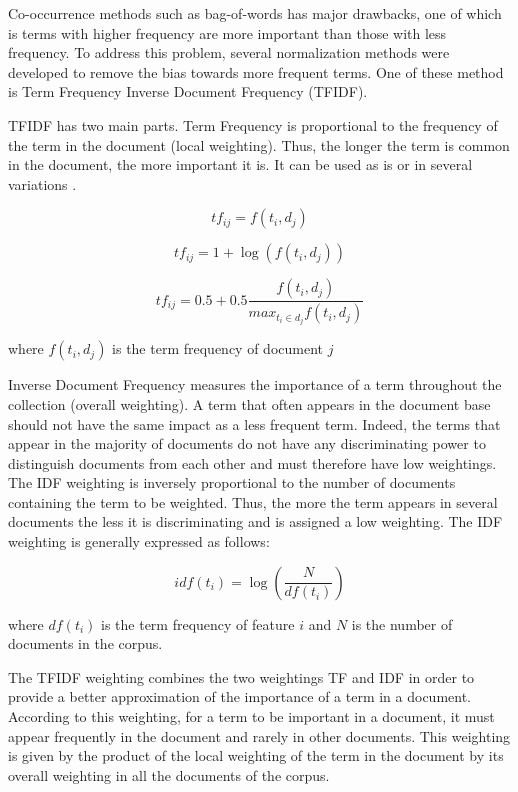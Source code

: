 Co-occurrence methods such as bag-of-words has major drawbacks, one of which is terms with higher frequency are more important than those with less frequency. To address this problem, several normalization methods were developed to remove the bias towards more frequent terms. One of these method is Term Frequency Inverse Document Frequency (TFIDF).

TFIDF has two main parts. Term Frequency is proportional to the frequency of the term in the document (local weighting). Thus, the longer the term is common in the document, the more important it is. It can be used as is or in several variations \citep{singhal1997learning} \citep{sable2001using}.

$$t f _ { i j } = f \left( t _ { i } , d _ { j } \right)$$

$$t f _ { i j } = 1 + \log \left( f \left( t _ { i } , d _ { j } \right) \right)$$

$$ t f _ { i j } = 0.5 + 0.5 \frac { f \left( t _ { i } , d _ { j } \right) } { m a x _ { t _ { i } \in d _ { j } } f \left( t _ { i } , d _ { j } \right) }$$

where $f(t_{i},d_{j})$ is the term frequency of document $j$

Inverse Document Frequency measures the importance of a term throughout the collection (overall weighting). A term that often appears in the document base should not have the same impact as a less frequent term. Indeed, the terms that appear in the majority of documents do not have any discriminating power to distinguish documents from each other and must therefore have low weightings. The IDF weighting is inversely proportional to the number of documents containing the term to be weighted. Thus, the more the term appears in several documents the less it is discriminating and is assigned a low weighting. The IDF weighting is generally expressed as follows:

$$i d f \left( t _ { i } \right) = \log \left( \frac { N } { d f \left( t _ { i } \right) } \right)$$

where $df(t_{i})$ is the term frequency of feature $i$ and $N$ is the number of documents in the corpus.

The TFIDF weighting combines the two weightings TF and IDF in order to
provide a better approximation of the importance of a term in a
document. According to this weighting, for a term to be important in a
document, it must appear frequently in the document and rarely in other
documents. This weighting is given by the product of the local weighting
of the term in the document by its overall weighting in all the
documents of the corpus.

